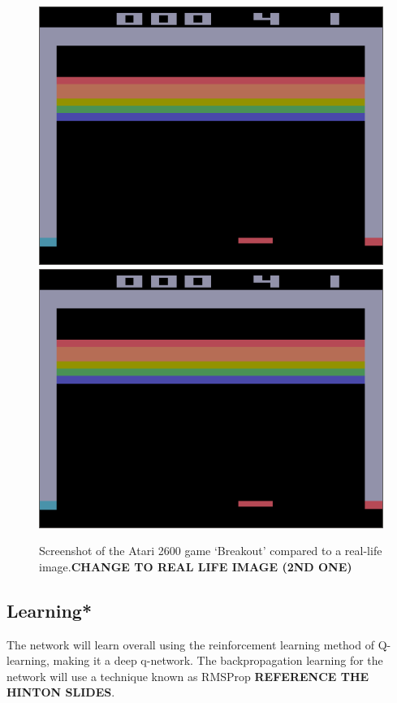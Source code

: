 \documentclass[10pt]{article}
\begin{document}
		\begin{figure}[h]				
			\includegraphics[scale=0.5]{img/screenshot}
			\includegraphics[scale=0.5]{img/screenshot}
			\centering
			\caption{Screenshot of the Atari 2600 game `Breakout' compared to a real-life image.\textbf{CHANGE TO REAL LIFE IMAGE (2ND ONE)}}
			\label{fig:screenshot}
		\end{figure}
	
	\bigskip
	
	\subsection{Learning*}
		The network will learn overall using the reinforcement learning method of Q-learning, making it a deep q-network. The backpropagation learning for the network will use a technique known as RMSProp \textbf{REFERENCE THE HINTON SLIDES}.\\
		
\end{document}
